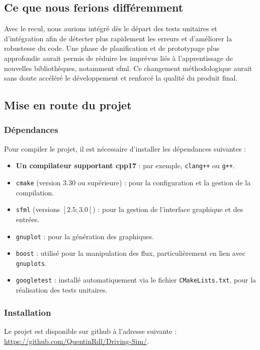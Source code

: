 \subsection{Ce que nous ferions différemment}\label{subsec:ce-que-nous-ferions-differemment}
Avec le recul, nous aurions intégré dès le départ des tests unitaires et d'intégration afin de détecter plus rapidement les erreurs et d'améliorer la robustesse du code.
Une phase de planification et de prototypage plus approfondie aurait permis de réduire les imprévus liés à l'apprentissage de nouvelles bibliothèques, notamment \gls{sfml}\@.
Ce changement méthodologique aurait sans doute accéléré le développement et renforcé la qualité du produit final.

\subsection{Mise en route du projet}\label{subsec:mise-en-route-du-projet}

\subsubsection{Dépendances}\label{subsubsec:dependances}
Pour compiler le projet, il est nécessaire d'installer les dépendances suivantes :
\begin{itemize}
    \item \textbf{Un compilateur supportant \gls{cpp}17} : par exemple, \texttt{clang++} ou \texttt{g++}.
    \item \texttt{\gls{cmake}} (version 3.30 ou supérieure) : pour la configuration et la gestion de la compilation.
    \item \texttt{\gls{sfml}} (versions $\left[2.5 ; 3.0\left[$) : pour la gestion de l'interface graphique et des entrées.
    \item \texttt{\gls{gnuplot}} : pour la génération des graphiques.
    \item \texttt{\gls{boost}} : utilisé pour la manipulation des flux, particulièrement en lien avec \texttt{\glspl{gnuplot}}.
    \item \texttt{\gls{googletest}} : installé automatiquement via le fichier \texttt{CMakeLists.txt}, pour la réalisation des tests unitaires.
\end{itemize}

\subsubsection{Installation}\label{subsubsec:installation}
Le projet est disponible sur \gls{github} à l'adresse suivante : \url{https://github.com/QuentinRdl/Driving-Sim/}.

